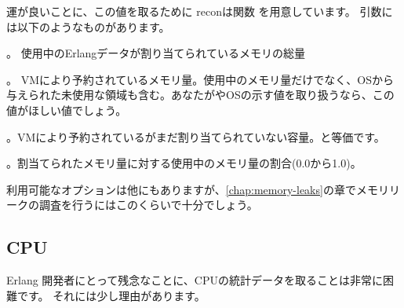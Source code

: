 運が良いことに、この値を取るために reconは関数  を用意しています。
引数には以下のようなものがあります。

\begin{itemize*}
	\item {}。 使用中のErlangデータが割り当てられているメモリの総量
    \item {}。 VMにより予約されているメモリ量。使用中のメモリ量だけでなく、OSから与えられた未使用な領域も含む。あなたがやOSの示す値を取り扱うなら、この値がほしい値でしょう。
	\item {}。VMにより予約されているがまだ割り当てられていない容量。と等価です。
  \item {}。割当てられたメモリ量に対する使用中のメモリ量の割合(0.0から1.0)。
\end{itemize*}

利用可能なオプションは他にもありますが、\ref{chap:memory-leaks}の章でメモリリークの調査を行うにはこのくらいで十分でしょう。

\subsection{CPU}
\label{subsec:global-cpu}

Erlang 開発者にとって残念なことに、CPUの統計データを取ることは非常に困難です。
それには少し理由があります。

